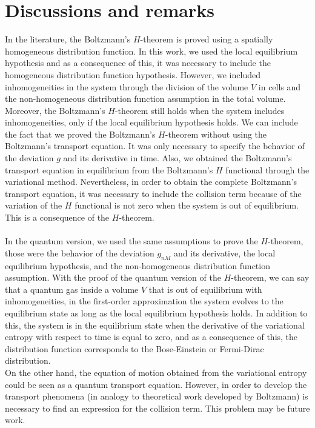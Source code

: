 
\section{Discussions and remarks}\label{sec:disscussion}

In the literature, the Boltzmann's $H$-theorem is proved using a spatially homogeneous distribution function. In this work, we used the local equilibrium hypothesis and as a consequence of this, it was necessary to include the homogeneous distribution function hypothesis. However, we included inhomogeneities in the system through the division of the volume $V$ in cells and the non-homogeneous distribution function assumption in the total volume. Moreover, the Boltzmann's $H$-theorem still holds when the system includes inhomogeneities, only if the local equilibrium hypothesis holds. We can include the fact that we proved the Boltzmann's $H$-theorem without using the Boltzmann's transport equation. It was only necessary to specify the behavior of the deviation $g$ and its derivative in time. Also, we obtained the Boltzmann's transport equation in equilibrium from the Boltzmann's $H$ functional through the variational method. Nevertheless, in order to obtain the complete Boltzmann's transport equation, it was necessary to include the collision term because of the variation of the $H$ functional is not zero when the system is out of equilibrium. This is a consequence of the $H$-theorem.\\
\\
In the quantum version, we used the same assumptions to prove the $H$-theorem, those were the behavior of the deviation $g_{nM}$ and its derivative, the local equilibrium hypothesis, and the non-homogeneous distribution function assumption. With the proof of the quantum version of the $H$-theorem, we can say that a quantum gas inside a volume $V$ that is out of equilibrium with inhomogeneities, in the first-order approximation the system evolves to the equilibrium state as long as the local equilibrium hypothesis holds. In addition to this, the system is in the equilibrium state when the derivative of the variational entropy with respect to time is equal to zero, and as a consequence of this, the distribution function corresponds to the Bose-Einstein or Fermi-Dirac distribution.\\
On the other hand, the equation of motion obtained from the variational entropy could be seen as a quantum transport equation. However, in order to develop the transport phenomena (in analogy to theoretical work developed by Boltzmann) is necessary to find an expression for the collision term. This problem may be future work.\\
